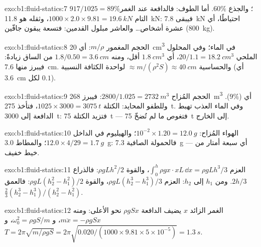 \begin{solution}{exo:b1:fluid-statics:7}
$917/1025 = 89\%$؛ والجذع $60\%$. أما الطوف: فالدافعة عند الغمر التام $1000 \times
2.0 \times 9.81 = \qty{19.6}{kN}$، وثقله هو \qty{11.8}{kN}: فيبقى \qty{7.8}{kN}
احتياطًا، أي عشرة أشخاص\dots{} والعاشر مبلول القدمين: فتسعة
يبقون جافّين (\qty{800}{kg}).
\end{solution}

\begin{solution}{exo:b1:fluid-statics:8}
الحجم المغمور $m/\rho$: أي \qty{20}{cm^3} في الماء؛ وفي المحلول الملحي $20/1.1 = \qty{18.2}{cm^3}$،
أي $\qty{1.8}{cm^3}$ أقل، ومنه $1.8/0.50 = \qty{3.6}{cm}$ من الساق زيادةً: فيبرز منها \qty{7.6}{cm}.
والحساسية $\approx m/(\rho^2S) \approx \qty{40}{cm}$ لواحدة الكثافة
النسبية (أي \qty{3.6}{cm} لكل $0.1$).
\end{solution}

\begin{solution}{exo:b1:fluid-statics:9}
الحجم المُزاح $2800/1.025 = \qty{2732}{m^3}$: فيبرز \qty{268}{m^3} أي ($9\%$).
وللطفو المحايد: الكتلة $1025 \times 3000 = \qty{3075}{t}$، فتأخذ \qty{275}{t}.
وفي الماء العذب تهبط الدافعة إلى \qty{3000}{t}: فتزيد الكتلة \qty{75}{t} --- فتغوص
ما لم تُضخّ \qty{75}{t} إلى الخارج.
\end{solution}

\begin{solution}{exo:b1:fluid-statics:10}
الهواء المُزاح: $10^{-2} \times 1.20 = \qty{12.0}{g}$؛ والهيليوم في الداخل $12.0 \times
4/29 = \qty{1.7}{g}$؛ والمطاط \qty{3.0}{g}: فالحمولة الصافية \qty{7.3}{g} --- أي سبعة أمتار
من خيط خفيف.
\end{solution}

\begin{solution}{exo:b1:fluid-statics:11}
العزم $\int_0^h\rho gx\cdot xL\,\dd x = \rho gLh^3/3$، والقوة $\rho gLh^2/2$:
فالذراع $2h/3$. ومن $h_1$ إلى $h_2$: العزم $\rho gL(h_2^3 - h_1^3)/3$، والقوة
$\rho gL(h_2^2 - h_1^2)/2$: فالعمق $\frac23(h_2^3 - h_1^3)/(h_2^2 - h_1^2)$.
\end{solution}

\begin{solution}{exo:b1:fluid-statics:12}
الغمر الزائد $x$ يضيف الدافعة $\rho gSx$ نحو الأعلى: ومنه $m\ddot x = -\rho gSx$،
و $\omega_0^2 = \rho gS/m$، و $T = 2\pi\sqrt{m/\rho gS} = 2\pi\sqrt{0.020/(1000 \times
9.81 \times 5\times10^{-5})} = \qty{1.3}{s}$.
\end{solution}

